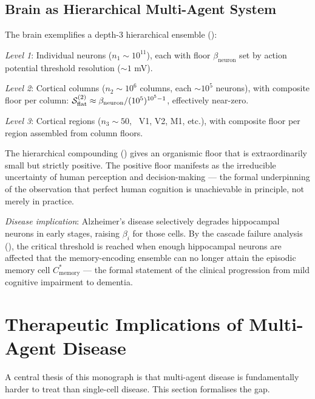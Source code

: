\subsection{Brain as Hierarchical Multi-Agent System}

\begin{example}
\label{ex:brain-ensemble}
The brain exemplifies a depth-3 hierarchical ensemble
():

\textit{Level 1}: Individual neurons ($n_1 \sim 10^{11}$), each with floor
$\beta_{\mathrm{neuron}}$ set by action potential threshold resolution
($\sim 1$ mV).

\textit{Level 2}: Cortical columns ($n_2 \sim 10^6$ columns, each $\sim 10^5$
neurons), with composite floor per column:
$\mathcal{S}_{\mathrm{flat}}^{(2)} \approx \beta_{\mathrm{neuron}} / (10^5)^{10^5-1}$,
effectively near-zero.

\textit{Level 3}: Cortical regions ($n_3 \sim 50$, \eg\ V1, V2, M1, etc.),
with composite floor per region assembled from column floors.

The hierarchical compounding () gives an
organismic floor that is extraordinarily small but strictly positive.  The
positive floor manifests as the irreducible uncertainty of human perception
and decision-making — the formal underpinning of the observation that perfect
human cognition is unachievable in principle, not merely in practice.

\textit{Disease implication}: Alzheimer's disease selectively degrades
hippocampal neurons in early stages, raising $\beta_i$ for those cells.
By the cascade failure analysis (), the critical
threshold is reached when enough hippocampal neurons are affected that the
memory-encoding ensemble can no longer attain the episodic memory cell
$C^*_{\mathrm{memory}}$ — the formal statement of the clinical progression
from mild cognitive impairment to dementia.
\end{example}

\section{Therapeutic Implications of Multi-Agent Disease}
\label{sec:therapeutic-implications}

A central thesis of this monograph is that multi-agent disease is
fundamentally harder to treat than single-cell disease.  This section
formalises the gap.

